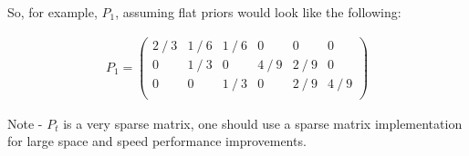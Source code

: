 \documentclass[11pt,a4,singlespacing,titlepagenumber=on]{scrreprt}
\numberwithin{equation}{chapter} %
\theoremstyle{remark}
\begin{document}
So, for example, $P_1$, assuming flat priors would look like the following:

\begin{align}
P_1 =
\begin{pmatrix}
  2\mathbin{/}3 & 1\mathbin{/}6 & 1\mathbin{/}6 & 0 & 0 & 0\\
  0 & 1\mathbin{/}3 & 0 & 4\mathbin{/}9 & 2\mathbin{/}9 & 0\\
  0 & 0 & 1\mathbin{/}3 & 0 & 2\mathbin{/}9 & 4\mathbin{/}9\\
\end{pmatrix}
\end{align}


Note - $P_t$ is a very sparse matrix, one should use a sparse matrix implementation for large space and speed performance improvements.
\end{document}
